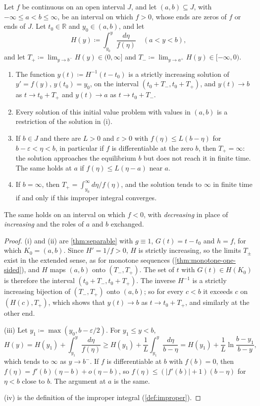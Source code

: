 \begin{theorem}
\label{thm:between-equilibria}
Let $f$ be continuous on an open interval $J$, and let $(a,b)\subseteq J$, with $-\infty\le a<b\le\infty$, be an interval on which $f>0$, whose ends are zeros of $f$ or ends of $J$. Let $t_0\in\mathbb R$ and $y_0\in(a,b)$, and let
\[
H(y)\coloneqq\int_{y_0}^y\frac{d\eta}{f(\eta)}\quad(a<y<b),
\]
and let $T_+\coloneqq\lim_{y\to b^-}H(y)\in(0,\infty]$ and $T_-\coloneqq\lim_{y\to a^+}H(y)\in[-\infty,0)$.
\begin{enumerate}
\item The function $y(t)\coloneqq H^{-1}(t-t_0)$ is a strictly increasing solution of $y'=f(y)$, $y(t_0)=y_0$, on the interval $(t_0+T_-,t_0+T_+)$, and $y(t)\to b$ as $t\to t_0+T_+$ and $y(t)\to a$ as $t\to t_0+T_-$.
\item Every solution of this initial value problem with values in $(a,b)$ is a restriction of the solution in (i).
\item If $b\in J$ and there are $L>0$ and $\varepsilon>0$ with $f(\eta)\le L(b-\eta)$ for $b-\varepsilon<\eta<b$, in particular if $f$ is differentiable at the zero $b$, then $T_+=\infty$: the solution approaches the equilibrium $b$ but does not reach it in finite time. The same holds at $a$ if $f(\eta)\le L(\eta-a)$ near $a$.
\item If $b=\infty$, then $T_+=\int_{y_0}^\infty d\eta/f(\eta)$, and the solution tends to $\infty$ in finite time if and only if this improper integral converges.
\end{enumerate}
The same holds on an interval on which $f<0$, with \emph{decreasing} in place of \emph{increasing} and the roles of $a$ and $b$ exchanged.
\end{theorem}

\begin{proof}
(i) and (ii) are \cref{thm:separable} with $g\equiv1$, $G(t)=t-t_0$ and $h=f$, for which $K_0=(a,b)$. Since $H'=1/f>0$, $H$ is strictly increasing, so the limits $T_\pm$ exist in the extended sense, as for monotone sequences (\cref{thm:monotone-one-sided}), and $H$ maps $(a,b)$ onto $(T_-,T_+)$. The set of $t$ with $G(t)\in H(K_0)$ is therefore the interval $(t_0+T_-,t_0+T_+)$. The inverse $H^{-1}$ is a strictly increasing bijection of $(T_-,T_+)$ onto $(a,b)$; so for every $c<b$ it exceeds $c$ on $(H(c),T_+)$, which shows that $y(t)\to b$ as $t\to t_0+T_+$, and similarly at the other end.

(iii) Let $y_1\coloneqq\max(y_0,b-\varepsilon/2)$. For $y_1\le y<b$,
\[
H(y)=H(y_1)+\int_{y_1}^y\frac{d\eta}{f(\eta)}\ge H(y_1)+\frac1L\int_{y_1}^y\frac{d\eta}{b-\eta}=H(y_1)+\frac1L\ln\frac{b-y_1}{b-y},
\]
which tends to $\infty$ as $y\to b^-$. If $f$ is differentiable at $b$ with $f(b)=0$, then $f(\eta)=f'(b)(\eta-b)+o(\eta-b)$, so $f(\eta)\le(|f'(b)|+1)(b-\eta)$ for $\eta<b$ close to $b$. The argument at $a$ is the same.

(iv) is the definition of the improper integral (\cref{def:improper}).
\end{proof}

